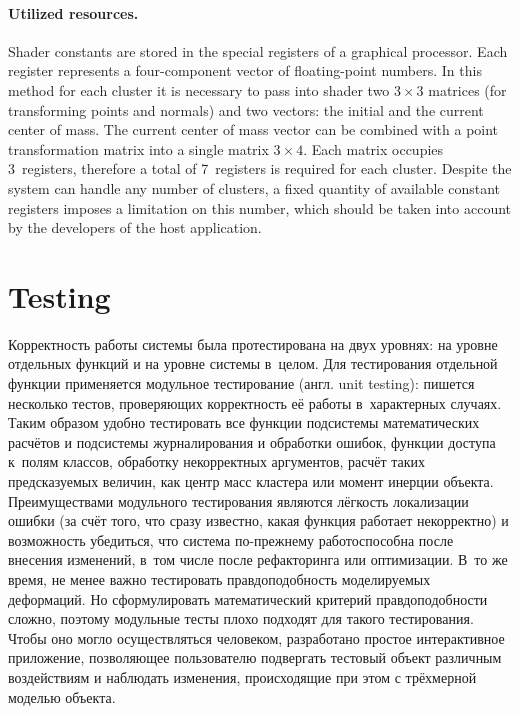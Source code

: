 \documentclass[a4paper, 12pt, titlepage]{extarticle}
\newcommand{\eng}[1]{#1}
\begin{document}
        \paragraph{Utilized resources.}
        Shader constants are stored in the special registers of a graphical processor. Each register
        represents a four-component vector of floating-point numbers. In this method for each
        cluster it is necessary to pass into shader two $3 \times 3$ matrices (for transforming
        points and normals) and two vectors: the initial and the current center of mass. The current
        center of mass vector can be combined with a point transformation matrix into a single
        matrix $3 \times 4$. Each matrix occupies 3~registers, therefore a total of 7~registers is
        required for each cluster. Despite the system can handle any number of clusters, a fixed
        quantity of available constant registers imposes a limitation on this number, which should
        be taken into account by the developers of the host application.

  \section{Testing}

\begin{original}
      Корректность работы системы была протестирована на двух уровнях: на уровне отдельных функций и на
      уровне системы в~целом. Для тестирования отдельной функции применяется модульное тестирование (англ. \eng{unit testing}):
      пишется несколько тестов, проверяющих корректность её работы в~характерных случаях. Таким
      образом удобно тестировать все функции подсистемы математических расчётов и подсистемы
      журналирования и обработки ошибок, функции доступа к~полям классов, обработку некорректных
      аргументов, расчёт таких предсказуемых величин, как центр масс кластера или
      момент инерции объекта. Преимуществами модульного тестирования являются лёгкость локализации ошибки
      (за счёт того, что сразу известно, какая функция работает некорректно) и возможность
      убедиться, что система по-прежнему работоспособна после внесения изменений, в~том числе
      после рефакторинга или оптимизации. В~то же время, не менее важно тестировать правдоподобность
      моделируемых деформаций. Но сформулировать математический критерий правдоподобности сложно,
      поэтому модульные тесты плохо подходят для такого тестирования. Чтобы оно могло осуществляться
      человеком, разработано простое интерактивное приложение, позволяющее пользователю подвергать
      тестовый объект различным воздействиям и наблюдать изменения, происходящие при этом с
      трёхмерной моделью объекта.
\end{original}
\end{document}
